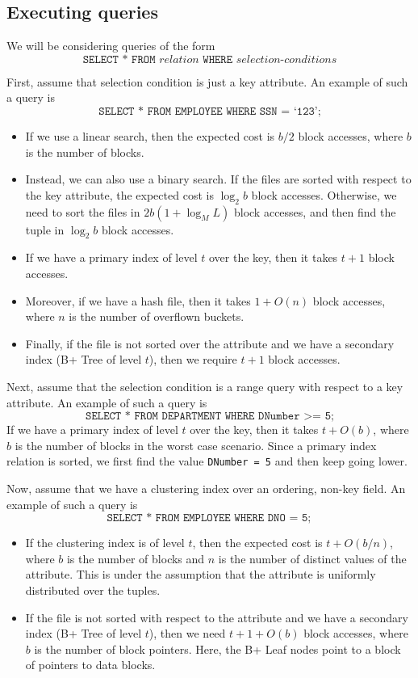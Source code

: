 \documentclass[a4paper, openany]{memoir}
\theoremstyle{definition}
\theoremstyle{plain}
\begin{document}
\subsection{Executing queries}
We will be considering queries of the form
\[\texttt{SELECT * FROM } \textit{relation} \texttt{ WHERE } \textit{selection-conditions}\]

First, assume that selection condition is just a key attribute. An example of such a query is
\[\texttt{SELECT * FROM EMPLOYEE WHERE SSN = `123';}\]
\begin{itemize}
    \item If we use a linear search, then the expected cost is $b/2$ block accesses, where $b$ is the number of blocks. 
    \item Instead, we can also use a binary search. If the files are sorted with respect to the key attribute, the expected cost is $\log_2 b$ block accesses. Otherwise, we need to sort the files in $2b(1 + \log_M L)$ block accesses, and then find the tuple in $\log_2 b$ block accesses.
    \item If we have a primary index of level $t$ over the key, then it takes $t + 1$ block accesses. 
    \item Moreover, if we have a hash file, then it takes $1 + O(n)$ block accesses, where $n$ is the number of overflown buckets.
    \item Finally, if the file is not sorted over the attribute and we have a secondary index (B+ Tree of level $t$), then we require $t + 1$ block accesses.
\end{itemize}

Next, assume that the selection condition is a range query with respect to a key attribute. An example of such a query is
\[\texttt{SELECT * FROM DEPARTMENT WHERE DNumber >= 5;}\]
If we have a primary index of level $t$ over the key, then it takes $t + O(b)$, where $b$ is the number of blocks in the worst case scenario. Since a primary index relation is sorted, we first find the value \texttt{DNumber = 5} and then keep going lower.

Now, assume that we have a clustering index over an ordering, non-key field. An example of such a query is
\[\texttt{SELECT * FROM EMPLOYEE WHERE DNO = 5};\]
\begin{itemize}
    \item If the clustering index is of level $t$, then the expected cost is $t + O(b/n)$, where $b$ is the number of blocks and $n$ is the number of distinct values of the attribute. This is under the assumption that the attribute is uniformly distributed over the tuples.
    \item If the file is not sorted with respect to the attribute and we have a secondary index (B+ Tree of level $t$), then we need $t + 1 + O(b)$ block accesses, where $b$ is the number of block pointers. Here, the B+ Leaf nodes point to a block of pointers to data blocks.
\end{itemize}
\end{document}
